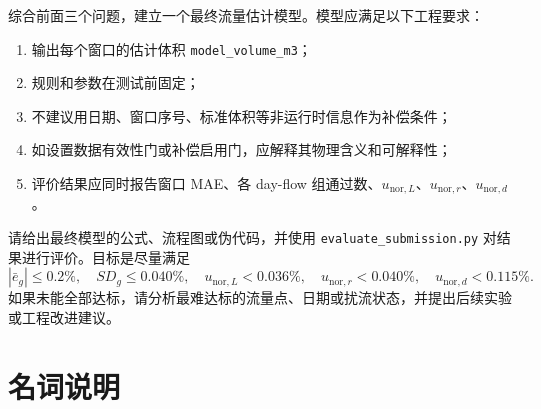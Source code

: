 \documentclass[UTF8,a4paper,11pt]{ctexart}
\begin{document}
综合前面三个问题，建立一个最终流量估计模型。模型应满足以下工程要求：
\begin{enumerate}
  \item 输出每个窗口的估计体积 \texttt{model\_volume\_m3}；
  \item 规则和参数在测试前固定；
  \item 不建议用日期、窗口序号、标准体积等非运行时信息作为补偿条件；
  \item 如设置数据有效性门或补偿启用门，应解释其物理含义和可解释性；
  \item 评价结果应同时报告窗口 MAE、各 day-flow 组通过数、$u_{\mathrm{nor},L}$、$u_{\mathrm{nor},r}$、$u_{\mathrm{nor},d}$。
\end{enumerate}

请给出最终模型的公式、流程图或伪代码，并使用 \texttt{evaluate\_submission.py} 对结果进行评价。目标是尽量满足
\[
|\bar e_g|\le 0.2\%,\quad SD_g\le 0.040\%,\quad
u_{\mathrm{nor},L}<0.036\%,\quad
u_{\mathrm{nor},r}<0.040\%,\quad
u_{\mathrm{nor},d}<0.115\%.
\]
如果未能全部达标，请分析最难达标的流量点、日期或扰流状态，并提出后续实验或工程改进建议。

\section*{名词说明}
\end{document}
